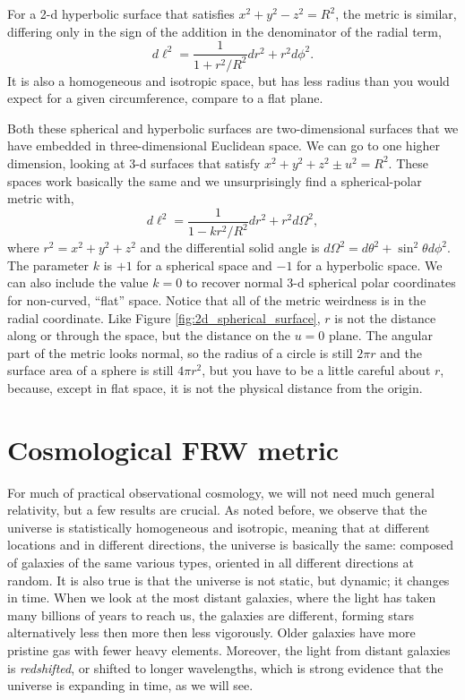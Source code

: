 For a 2-d hyperbolic surface that satisfies $x^2 + y^2 - z^2 = R^2$, the metric is similar, differing only in the sign of the addition in the denominator of the radial term,
\begin{equation}
    d\ell^2 = \frac{1}{1+r^2/R^2} dr^2 + r^2 d\phi^2.
\end{equation}
It is also a homogeneous and isotropic space, but has less radius than you would expect for a given circumference, compare to a flat plane.

Both these spherical and hyperbolic surfaces are two-dimensional surfaces that we have embedded in three-dimensional Euclidean space.  We can go to one higher dimension, looking at 3-d surfaces that satisfy $x^2 + y^2 + z^2 \pm u^2 = R^2$.  These spaces work basically the same and we unsurprisingly find a spherical-polar metric with,
\begin{equation}
  d\ell^2 =  \frac{1}{1-kr^2/R^2} dr^2 + r^2 d\Omega^2,  \label{eqn:spatial_metric}
\end{equation}
where $r^2 = x^2 + y^2 + z^2$ and the differential solid angle is $d\Omega^2 = d\theta^2 + \sin^2 \theta d\phi^2$.  The parameter $k$ is $+1$ for a spherical space and $-1$ for a hyperbolic space.  We can also include the value $k=0$ to recover normal 3-d spherical polar coordinates for non-curved, ``flat'' space.  Notice that all of the metric weirdness is in the radial coordinate.  Like Figure \ref{fig:2d_spherical_surface},  $r$ is not the distance along or through the space, but the distance on the $u=0$ plane.  The angular part of the metric looks normal, so the  radius of a circle is still $2\pi r$ and the surface area of a sphere is still $4\pi r^2$, but you have to be a little careful about $r$, because, except in flat space, it is not the physical distance from the origin.

\section{Cosmological FRW metric}
For much of practical observational cosmology, we will not need much general relativity, but a few results are crucial.  As noted before, we observe that the universe is statistically homogeneous and isotropic, meaning that at different locations and in different directions, the universe is basically the same: composed of galaxies of the same various types, oriented in all different directions at random.  It is also true is that the universe is not static, but dynamic; it changes in time.  When we look at the most distant galaxies, where the light has taken many billions of years to reach us, the galaxies are different, forming stars alternatively less then more then less vigorously.  Older galaxies have more pristine gas with fewer heavy elements.  Moreover, the light from distant galaxies is \textit{redshifted}, or shifted to longer wavelengths, which is strong evidence that the universe is expanding in time, as we will see.

